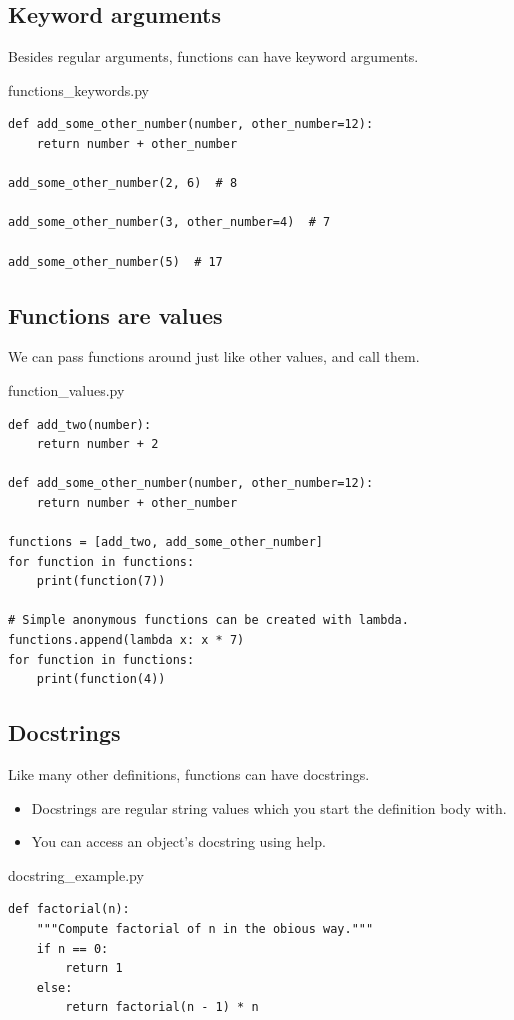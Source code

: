\documentclass[aspectratio=1610,slidestop]{beamer}
\begin{document}
\subsection{Keyword arguments}
\begin{pframe}
 Besides regular arguments, functions can have keyword arguments.
 \begin{pythonfile}{functions\_keywords.py}
  \begin{verbatim}
def add_some_other_number(number, other_number=12):
    return number + other_number

add_some_other_number(2, 6)  # 8

add_some_other_number(3, other_number=4)  # 7

add_some_other_number(5)  # 17
  \end{verbatim}
 \end{pythonfile}
\end{pframe}


\subsection{Functions are values}
\begin{pframe}
 We can pass functions around just like other values, and call them.
 \begin{pythonfile}{function\_values.py}
  \begin{verbatim}
def add_two(number):
    return number + 2

def add_some_other_number(number, other_number=12):
    return number + other_number

functions = [add_two, add_some_other_number]
for function in functions:
    print(function(7))

# Simple anonymous functions can be created with lambda.
functions.append(lambda x: x * 7)
for function in functions:
    print(function(4))
  \end{verbatim}
 \end{pythonfile}
\end{pframe}



\subsection{Docstrings}
\begin{pframe}
 Like many other definitions, functions can have docstrings.
 \begin{itemize}
  \item Docstrings are regular string values which you start the definition
  body with.
  \item You can access an object's docstring using help.
 \end{itemize}
 \begin{pythonfile}{docstring\_example.py}
  \begin{verbatim}
def factorial(n):
    """Compute factorial of n in the obious way."""
    if n == 0:
        return 1
    else:
        return factorial(n - 1) * n
  \end{verbatim}
 \end{pythonfile}
\end{pframe}
\end{document}
